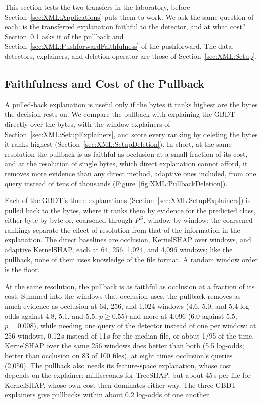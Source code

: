 This section tests the two transfers in the laboratory, before Section~\ref{sec:XML:Applications} puts them to work.
We ask the same question of each: is the transferred explanation faithful to the detector, and at what cost? Section~\ref{sec:XML:PullbackFaithfulness} asks it of the pullback and Section~\ref{sec:XML:PushforwardFaithfulness} of the
pushforward. The data, detectors, explainers, and deletion operator are those of Section~\ref{sec:XML:Setup}.

\subsection{Faithfulness and Cost of the Pullback}
\label{sec:XML:PullbackFaithfulness}

A pulled-back explanation is useful only if the bytes it ranks highest are the bytes the decision rests on. We compare
the pullback with explaining the GBDT directly over the bytes, with the window explainers of
Section~\ref{sec:XML:SetupExplainers}, and score every ranking by deleting the bytes it ranks highest
(Section~\ref{sec:XML:SetupDeletion}). In short, at the same resolution the pullback is as faithful as occlusion at
a small fraction of its cost, and at the resolution of single bytes, which direct explanation cannot
afford, it removes more evidence than any direct method, adaptive ones included, from one query instead of tens of
thousands
(Figure~\ref{fig:XML:PullbackDeletion}).

Each of the GBDT's three explanations (Section~\ref{sec:XML:SetupExplainers}) is pulled back to the bytes, where it
ranks them by evidence for the predicted class, either byte by byte or, coarsened through $P^G$, window by window; the
coarsened rankings separate the effect of resolution from that of the information in the explanation. The direct
baselines are occlusion, KernelSHAP over windows, and adaptive KernelSHAP, each at 64, 256, 1{,}024, and 4{,}096
windows; like the pullback, none of them uses knowledge of the file format. A random window order is the floor.



At the same resolution, the pullback is as faithful as occlusion at a fraction of its cost. Summed into the
windows that occlusion uses, the pullback removes as much evidence as occlusion at 64, 256, and 1{,}024 windows (4.6,
5.0, and 5.4 log-odds against 4.8, 5.1, and 5.5; $p \geq 0.55$) and more at 4{,}096 (6.0 against 5.5, $p = 0.008$),
while needing one query of the detector instead of one per window: at 256 windows, 0.12\,s instead of 11\,s for the
median file, or about 1/95 of the time. KernelSHAP over the same 256 windows does better than both (5.5 log-odds; better than occlusion on 83 of 100
files), at eight times occlusion's queries (2{,}050). The pullback also needs its feature-space explanation, whose cost depends on the explainer: milliseconds for TreeSHAP, but about 45\,s per file for
KernelSHAP, whose own cost then dominates either way. The three GBDT explainers give pullbacks within about 0.2
log-odds of one another.

